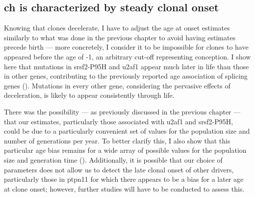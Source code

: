 \begin{figure}[!ht]
	\label{fig:historical-growth-representation}
\end{figure}

\begin{figure}[!ht]
	\label{fig:deceleration-figure-full}
\end{figure}

\begin{figure}[!ht]
	\label{fig:historical-growth-tally}
\end{figure}

\subsection{\ac{ch} is characterized by steady clonal onset}

Knowing that clones decelerate, I have to adjust the age at onset estimates similarly to what was done in the previous chapter to avoid having estimates precede birth --- more concretely, I consider it to be impossible for clones to have appeared before the age of -1, an arbitrary cut-off representing conception. I show here that mutations in \ac{srsf2}-P95H and \ac{u2af1} appear much later in life than those in other genes, contributing to the previously reported age association of splicing genes \cite{McKerrell2015-rl} (). Mutations in every other gene, considering the pervasive effects of deceleration, is likely to appear consistently through life.

\begin{figure}[!ht]
	\label{fig:ages-at-onset}
\end{figure}

There was the possibility --- as previously discussed in the previous chapter --- that our estimates, particularly those associated with \ac{u2af1} and \ac{srsf2}-P95H, could be due to a particularly convenient set of values for the population size and number of generations per year. To better clarify this, I also show that this particular age bias remains for a wide array of possible values for the population size and generation time (). Additionally, it is possible that our choice of parameters does not allow us to detect the late clonal onset of other drivers, particularly those in \ac{ptpn11} for which there appears to be a bias for a later age at clone onset; however, further studies will have to be conducted to assess this.

